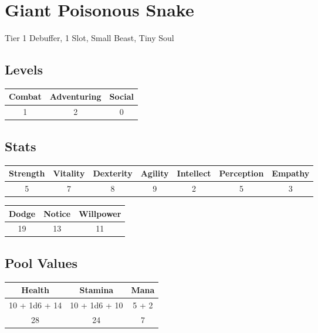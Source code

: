 \section{Giant Poisonous Snake}
Tier 1 Debuffer, 1 Slot, Small Beast, Tiny Soul\\

\subsection{Levels}
\begin{minipage}[H]{1\textwidth}
	\centering
	\begin{tabular}[c]{|c | c | c|}
		\hline
		Combat & Adventuring & Social\\
		\hline
		1 & 2 & 0\\
		\hline
	\end{tabular}
\end{minipage}

\subsection{Stats}
\begin{minipage}[H]{1\textwidth}
	\centering
	\begin{tabular}[c]{|c | c | c | c | c | c | c|}
		\hline
		Strength & Vitality & Dexterity & Agility & Intellect & Perception & Empathy\\
		\hline
		5 & 7 & 8 & 9 & 2 & 5 & 3\\
		\hline
	\end{tabular}
\end{minipage}
\bigbreak

\begin{minipage}[H]{1\textwidth}
	\centering
	\begin{tabular}[c]{|c | c | c|}
		\hline
		Dodge & Notice & Willpower\\
		\hline
		19 & 13 & 11\\
		\hline
	\end{tabular}
\end{minipage}

\subsection{Pool Values}
\bigbreak
\begin{minipage}[H]{1\textwidth}
	\centering
	\begin{tabular}[c]{|c | c | c|}
		\hline
		Health & Stamina & Mana\\
		\hline
		10 + 1d6 + 14 & 10 + 1d6 + 10 & 5 + 2 \\
		28 & 24 & 7\\
		\hline
	\end{tabular}
\end{minipage}
\noindent

